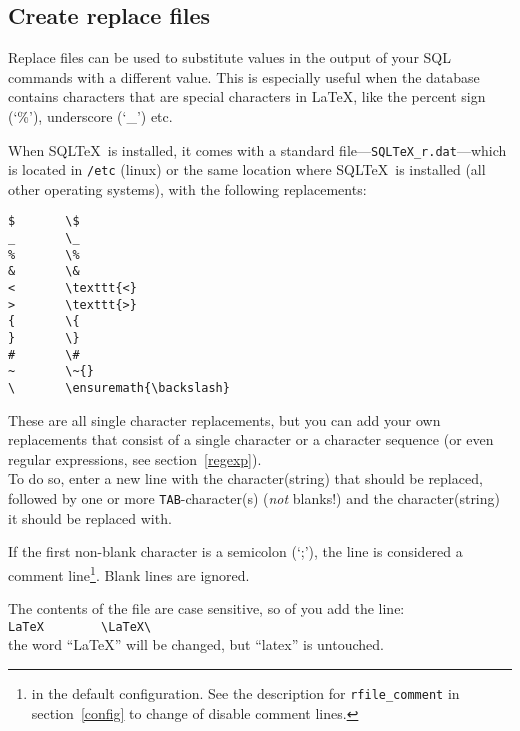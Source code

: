 \documentclass{article}
\begin{document}
\subsection{Create replace files}\label{replfiles}

Replace files can be used to substitute values in the output of your SQL commands with a different value. This is especially useful when the database
contains characters that are special characters in \LaTeX, like the percent sign (`\%'), underscore (`\_') etc.

When SQL\TeX\ is installed, it comes with a standard file---\texttt{SQLTeX\_r.dat}---which is located in \texttt{/etc} (linux) or the same location where
SQL\TeX\ is installed (all other operating systems), with the following replacements:

\vspace{3mm}

\noindent\begin{verbatim}
$       \$
_       \_
%       \%
&       \&
<       \texttt{<}
>       \texttt{>}
{       \{
}       \}
#       \#
~       \~{}
\       \ensuremath{\backslash}
\end{verbatim}

\vspace{3mm}

These are all single character replacements, but you can add your own replacements that consist of a single character or a character sequence (or even regular expressions, see section~\ref{regexp}).\\
To do so, enter a new line with the character(string) that should be replaced, followed by one or more \texttt{TAB}-character(s) (\textit{not} blanks!) and the character(string) it should be replaced with.

If the first non-blank character is a semicolon (`;'), the line is considered a comment line\footnote{ in the default configuration. See the description for \texttt{rfile\_comment} in section~\ref{config} to change of disable comment lines.}. Blank lines are ignored.

\vspace{3mm}

The contents of the file are case sensitive, so of you add the line: \\
\verb+LaTeX        \LaTeX\+ \\
the word ``LaTeX'' will be changed, but ``latex'' is untouched.

\vspace{3mm}
\end{document}
